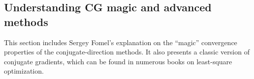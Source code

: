 
\subsection{Understanding CG magic and advanced methods}
This section includes Sergey Fomel's explanation on the ``magic''
convergence properties of the conjugate-direction methods. It also
presents a classic version of conjugate gradients, which can be found
in numerous books on least-square optimization.

